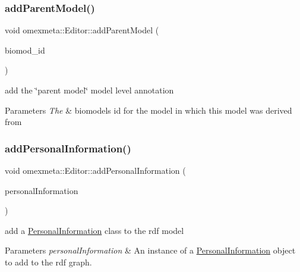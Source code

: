 \subsubsection{\texorpdfstring{add\+Parent\+Model()}{addParentModel()}}
{\footnotesize\ttfamily void omexmeta\+::\+Editor\+::add\+Parent\+Model (\begin{DoxyParamCaption}\item[{const std\+::string \&}]{biomod\+\_\+id }\end{DoxyParamCaption})}



add the \char`\"{}parent model\char`\"{} model level annotation 


\begin{DoxyParams}{Parameters}
{\em The} & biomodels id for the model in which this model was derived from \\
\hline
\end{DoxyParams}
\mbox{\label{classomexmeta_1_1Editor_a1b2e0f5859fe2e2784ecff2a78f7f1f8}} 
\subsubsection{\texorpdfstring{add\+Personal\+Information()}{addPersonalInformation()}\hspace{0.1cm}{\footnotesize\ttfamily [1/2]}}
{\footnotesize\ttfamily void omexmeta\+::\+Editor\+::add\+Personal\+Information (\begin{DoxyParamCaption}\item[{\hyperlink{classomexmeta_1_1PersonalInformation}{Personal\+Information} $\ast$}]{personal\+Information }\end{DoxyParamCaption})}



add a \hyperlink{classomexmeta_1_1PersonalInformation}{Personal\+Information} class to the rdf model 


\begin{DoxyParams}{Parameters}
{\em personal\+Information} & An instance of a \hyperlink{classomexmeta_1_1PersonalInformation}{Personal\+Information} object to add to the rdf graph. \\
\hline
\end{DoxyParams}
\mbox{\label{classomexmeta_1_1Editor_ae97ebb9bb2bc3ebd7d3b0a5eca9dfb0f}} 
